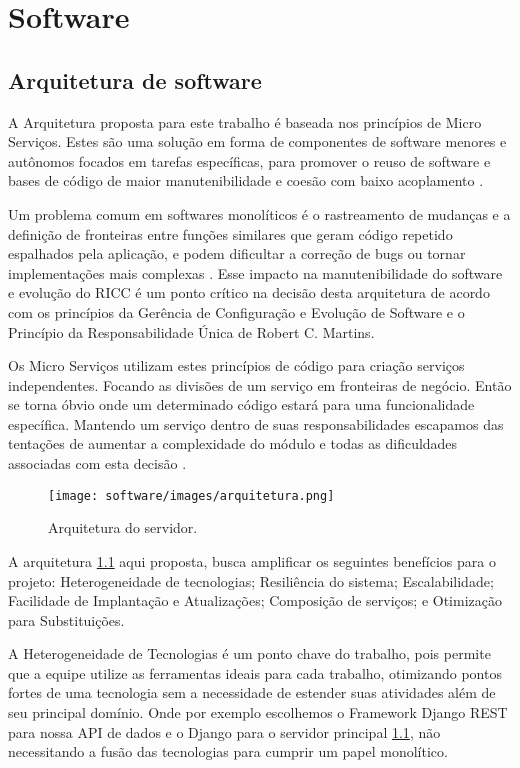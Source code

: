 \chapter[Software]{Software}
    \section{Arquitetura de software}

    A Arquitetura proposta para este trabalho é baseada nos princípios de Micro Serviços. Estes são uma solução em forma de componentes de software menores e autônomos focados em tarefas específicas, para promover o reuso de software e bases de código de maior manutenibilidade e coesão com baixo acoplamento \cite{newman_2018}.

    Um problema comum em softwares monolíticos é o rastreamento de mudanças e a definição de fronteiras entre funções similares que geram código repetido espalhados pela aplicação, e podem dificultar a correção de bugs ou tornar implementações mais complexas \cite{newman_2018}. Esse impacto na manutenibilidade do software e evolução do RICC é um ponto crítico na decisão desta arquitetura de acordo com os princípios da Gerência de Configuração e Evolução de Software \cite{gces} e o Princípio da Responsabilidade Única de Robert C. Martins.

    Os Micro Serviços utilizam estes princípios de código para criação serviços independentes. Focando as divisões de um serviço em fronteiras de negócio. Então se torna óbvio onde um determinado código estará para uma funcionalidade específica. Mantendo um serviço dentro de suas responsabilidades escapamos das tentações de aumentar a complexidade do módulo e todas as dificuldades associadas com esta decisão \cite{newman_2018}.

    \begin{figure}
        \texttt{[image: software/images/arquitetura.png]}
        \caption{Arquitetura do servidor.}
        \label{fig:arquitetura}
    \end{figure}

    A arquitetura \ref{fig:arquitetura} aqui proposta, busca amplificar os seguintes benefícios para o projeto: Heterogeneidade de tecnologias; Resiliência do sistema; Escalabilidade; Facilidade de Implantação e Atualizações; Composição de serviços; e Otimização para Substituições.

    A Heterogeneidade de Tecnologias é um ponto chave do trabalho, pois permite que a equipe utilize as ferramentas ideais para cada trabalho, otimizando pontos fortes de uma tecnologia sem a necessidade de estender suas atividades além de seu principal domínio. Onde por exemplo escolhemos o Framework Django REST para nossa API de dados e o Django para o servidor principal \ref{fig:arquitetura}, não necessitando a fusão das tecnologias para cumprir um papel monolítico.

